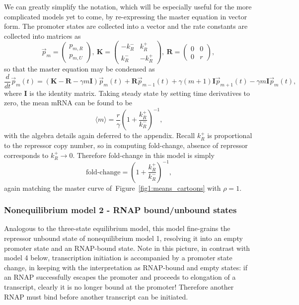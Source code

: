 \documentclass[12pt]{article}%
\newcommand{\vect}[1]{\vec{#1}}
\newcommand{\matr}[1]{\mathbf{#1}}
\newcommand{\deriv}[2][{}]{\frac{d #1}{d #2}}
\newcommand{\fig}[1]{Figure~\ref{#1}}
\begin{document}
We can greatly simplify the notation, which will be especially
useful for the more complicated models yet to come, by
re-expressing the master equation in vector form. The promoter
states are collected into a vector and the rate constants are
collected into matrices as
\begin{equation}
\vect{p}_m = \begin{pmatrix} p_{m,R} \\ p_{m,U} \end{pmatrix},\
\matr{K} = \begin{pmatrix} -k_R^- & k_R^+ \\ k_R^- & -k_R^+ \end{pmatrix},\
\matr{R} = \begin{pmatrix} 0 & 0 \\ 0 & r \end{pmatrix},\
\label{eq:2state_cme_matrices}
\end{equation}
so that the master equation may be condensed as
\begin{equation}
\deriv{t}\vect{p}_m(t) =
\left( \matr{K} - \matr{R} - \gamma m \matr{I} \right) \vect{p}_m(t)
                + \matr{R} \vect{p}_{m-1}(t)
                + \gamma (m+1) \matr{I} \vect{p}_{m+1}(t)
                - \gamma m \matr{I} \vect{p}_m(t),
\label{eq:2state_rep_cme}
\end{equation}
where $\matr{I}$ is the identity matrix.
Taking steady state by setting time derivatives to zero,
the mean mRNA can be found to be
\begin{equation}
\langle m \rangle = \frac{r}{\gamma}
        \left(1 + \frac{k_R^+}{k_R^-}\right)^{-1},
\end{equation}
with the algebra details again deferred to the appendix.
Recall $k_R^+$ is proportional to the repressor copy number, so
in computing fold-change, absence of repressor corresponds to
$k_R^+\rightarrow0$.
Therefore fold-change in this model is simply
\begin{equation}
\text{fold-change} = \left(1 + \frac{k_R^+}{k_R^-}\right)^{-1},
\end{equation}
again matching the master curve of~\fig{fig1:means_cartoons} with $\rho=1$.

\subsubsection{Nonequilibrium model 2 - RNAP bound/unbound states}
Analogous to the three-state equilibrium model, this model
fine-grains the repressor unbound state of nonequilibrium model 1,
resolving it into an empty promoter state and an RNAP-bound state.
Note in this picture, in contrast with model 4 below,
transcription initiation is accompanied by a promoter state
change, in keeping with the interpretation as RNAP-bound and
empty states: if an RNAP successfully escapes the promoter and
proceeds to elongation of a transcript, clearly it is no longer
bound at the promoter! Therefore another RNAP must bind before
another transcript can be initiated.
\end{document}
